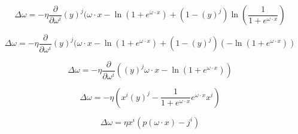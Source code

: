 \documentclass[11pt]{article} %
\begin{document}
\begin{equation}
\Delta \omega = -\eta \frac{\partial}{\partial \omega^i}  (y)^j (\omega \cdot x - \ln(1+e^{\omega \cdot x}) + (1-(y)^j) \ln( \frac{1}{1+e^{\omega \cdot x}})
\end{equation}


\begin{equation}
\Delta \omega = -\eta \frac{\partial}{\partial \omega^i}  (y)^j (\omega \cdot x - \ln(1+e^{\omega \cdot x}) + (1-(y)^j) (-\ln(1+e^{\omega \cdot x}))
\end{equation}


\begin{equation}
\Delta \omega = -\eta \frac{\partial}{\partial \omega^i}  ((y)^j \omega \cdot x - \ln(1+e^{\omega \cdot x}))
\end{equation}


\begin{equation}
\Delta \omega = -\eta  ( x^{i}(y)^j  - \frac{1}{1+e^{\omega \cdot x}} e^{\omega \cdot x} x^{i})
\end{equation}

\begin{equation}
\Delta \omega = \eta  x^{i} (p(\omega \cdot x)- j^{i})
\end{equation}
\end{document}
